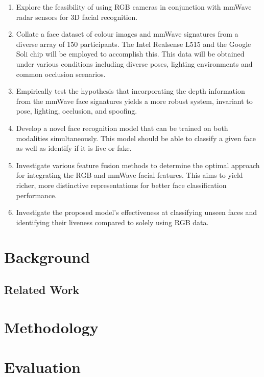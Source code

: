 \documentclass{mpaper}
\begin{document}
\begin{enumerate}
    \item Explore the feasibility of using RGB cameras in conjunction with mmWave radar sensors for 3D facial recognition.
    \item Collate a face dataset of colour images and mmWave signatures from a diverse array of 150 participants. The Intel Realsense L515 \cite{intel-l515} and the Google Soli chip \cite{lien2016soli} will be employed to accomplish this. This data will be obtained under various conditions including diverse poses, lighting environments and common occlusion scenarios.
    \item Empirically test the hypothesis that incorporating the depth information from the mmWave face signatures yields a more robust system, invariant to pose, lighting, occlusion, and spoofing.
    \item Develop a novel face recognition model that can be trained on both modalities simultaneously. This model should be able to classify a given face as well as identify if it is live or fake.
    \item Investigate various feature fusion methods to determine the optimal approach for integrating the RGB and mmWave facial features. This aims to yield richer, more distinctive representations for better face classification performance.
    \item Investigate the proposed model's effectiveness at classifying unseen faces and identifying their liveness compared to solely using RGB data.
\end{enumerate}


\section{Background}

\subsection{Related Work}



\section{Methodology}



\section{Evaluation}
\end{document}
